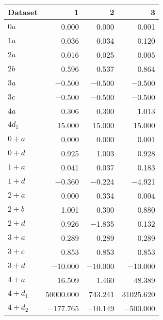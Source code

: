 \begin{tabular}{lrrr}
\toprule
 Dataset   &         1 &       2 &         3 \\
\midrule
 $0 a$     &     \num{0.000} &   \num{0.000} &     \num{0.001} \\
 $1 a$     &     \num{0.036} &   \num{0.034} &     \num{0.120} \\
 $2 a$     &     \num{0.016} &   \num{0.025} &     \num{0.005} \\
 $2 b$     &     \num{0.596} &   \num{0.537} &     \num{0.864} \\
 $3 a$     &    \num{-0.500} &  \num{-0.500} &    \num{-0.500} \\
 $3 c$     &    \num{-0.500} &  \num{-0.500} &    \num{-0.500} \\
 $4 a$     &     \num{0.306} &   \num{0.300} &     \num{1.013} \\
 $4 d_1$   &   \num{-15.000} & \num{-15.000} &   \num{-15.000} \\
 $0+ a$    &     \num{0.000} &   \num{0.000} &     \num{0.001} \\
 $0+ d$    &     \num{0.925} &   \num{1.003} &     \num{0.928} \\
 $1+ a$    &     \num{0.041} &   \num{0.037} &     \num{0.183} \\
 $1+ d$    &    \num{-0.360} &  \num{-0.224} &    \num{-4.921} \\
 $2+ a$    &     \num{0.000} &   \num{0.334} &     \num{0.004} \\
 $2+ b$    &     \num{1.001} &   \num{0.300} &     \num{0.880} \\
 $2+ d$    &     \num{0.926} &  \num{-1.835} &     \num{0.132} \\
 $3+ a$    &     \num{0.289} &   \num{0.289} &     \num{0.289} \\
 $3+ c$    &     \num{0.853} &   \num{0.853} &     \num{0.853} \\
 $3+ d$    &   \num{-10.000} & \num{-10.000} &   \num{-10.000} \\
 $4+ a$    &    \num{16.509} &   \num{1.460} &    \num{48.389} \\
 $4+ d_1$  & \num{50000.000} & \num{743.241} & \num{31025.620} \\
 $4+ d_2$  &  \num{-177.765} & \num{-10.149} &  \num{-500.000} \\
\bottomrule
\end{tabular}